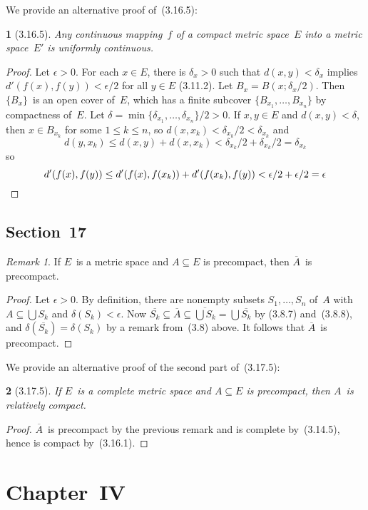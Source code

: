 \documentclass[letterpaper,12pt]{article}
\newcommand{\bigunion}{\bigcup}
\newcommand{\diam}{\delta}
\newcommand{\closure}[1]{\overline{#1}}
\theoremstyle{plain}
\newtheorem*{prop}{}
\theoremstyle{definition}
\theoremstyle{remark}
\newtheorem*{rmk}{Remark}
\begin{document}
\noindent We provide an alternative proof of~(3.16.5):
\begin{prop}[3.16.5]
Any continuous mapping~\(f\) of a compact metric space~\(E\) into a metric space~\(E'\) is uniformly continuous.
\end{prop}
\begin{proof}
Let \(\epsilon>0\). For each \(x\in E\), there is \(\delta_x>0\) such that \(d(x,y)<\delta_x\) implies \(d'(f(x),f(y))<\epsilon/2\) for all \(y\in E\) (3.11.2). Let \(B_x=B(x;\delta_x/2)\). Then \(\{B_x\}\)~is an open cover of~\(E\), which has a finite subcover \(\{B_{x_1},\ldots,B_{x_n}\}\) by compactness of~\(E\). Let \(\delta=\min\{\delta_{x_1},\ldots,\delta_{x_n}\}/2>0\). If \(x,y\in E\) and \(d(x,y)<\delta\), then \(x\in B_{x_k}\) for some \(1\le k\le n\), so \(d(x,x_k)<\delta_{x_k}/2<\delta_{x_k}\) and
\[d(y,x_k)\le d(x,y)+d(x,x_k)<\delta_{x_k}/2+\delta_{x_k}/2=\delta_{x_k}\]
so
\[d'(f(x),f(y))\le d'(f(x),f(x_k))+d'(f(x_k),f(y))<\epsilon/2+\epsilon/2=\epsilon\qedhere\]
\end{proof}

\subsection*{Section~17}
\begin{rmk}
If \(E\)~is a metric space and \(A\subseteq E\) is precompact, then \(\closure{A}\)~is precompact.
\end{rmk}
\begin{proof}
Let \(\epsilon>0\). By definition, there are nonempty subsets \(S_1,\ldots,S_n\) of~\(A\) with \(A\subseteq\bigunion S_k\) and \(\diam(S_k)<\epsilon\). Now \(\closure{S_k}\subseteq\closure{A}\subseteq\closure{\bigunion S_k}=\bigunion\closure{S_k}\) by (3.8.7) and~(3.8.8), and \(\diam(\closure{S_k})=\diam(S_k)\) by a remark from~(3.8) above. It follows that \(\closure{A}\)~is precompact.
\end{proof}

\noindent We provide an alternative proof of the second part of~(3.17.5):
\begin{prop}[3.17.5]
If \(E\)~is a complete metric space and \(A\subseteq E\) is precompact, then \(A\)~is relatively compact.
\end{prop}
\begin{proof}
\(\closure{A}\)~is precompact by the previous remark and is complete by~(3.14.5), hence is compact by~(3.16.1).
\end{proof}

\section*{Chapter~IV}
\end{document}
